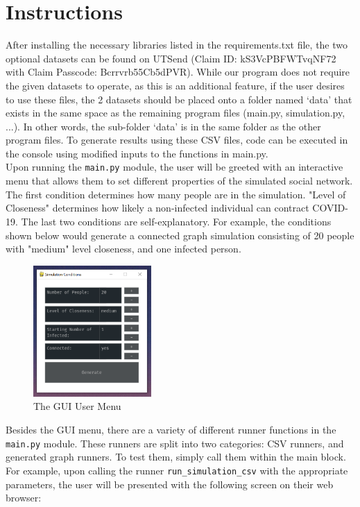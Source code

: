 \documentclass[fontsize=11pt]{article}
\newcommand{\ttt}[1]{\texttt{#1}}
\begin{document}
    \section*{Instructions}
    After installing the necessary libraries listed in the requirements.txt file, the two optional datasets can be found on UTSend (Claim ID: kS3VcPBFWTvqNF72 with Claim Passcode: Bcrrvrb55Cb5dPVR). While our program does not require the given datasets to operate, as this is an additional feature, if the user desires to use these files, the 2 datasets should be placed onto a folder named ‘data’ that exists in the same space as the remaining program files (main.py, simulation.py, ...). In other words, the sub-folder ‘data’ is in the same folder as the other program files. To generate results using these CSV files, code can be executed in the console using modified inputs to the functions in main.py. \\
    \noindent
    Upon running the \ttt{main.py} module, the user will be greeted with an interactive menu that allows them to set different properties of the simulated social network. The first condition determines how many people are in the simulation. "Level of Closeness" determines how likely a non-infected individual can contract COVID-19. The last two conditions are self-explanatory. For example, the conditions shown below would generate a connected graph simulation consisting of 20 people with "medium" level closeness, and one infected person.
    \begin{figure}[h]
        \centering
        \includegraphics[width=45mm,scale=0.3]{pictures/gui_menu.png}
        \caption{The GUI User Menu}
    \end{figure}
    \newline
    Besides the GUI menu, there are a variety of different runner functions in the \ttt{main.py} module. These runners are split into two categories: CSV runners, and generated graph runners. To test them, simply call them within the main block. For example, upon calling the runner \ttt{run\_simulation\_csv} with the appropriate parameters, the user will be presented with the following screen on their web browser:
\end{document}
